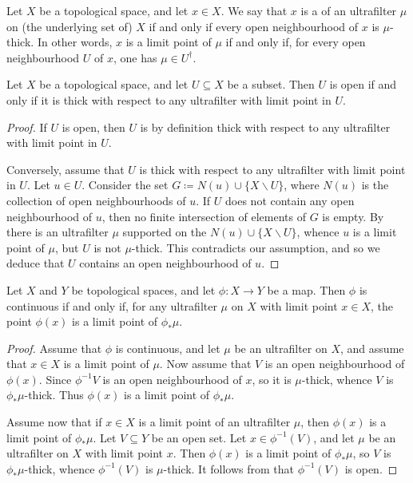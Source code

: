 \begin{dfn} \label{limitpointofultrafilter}
	Let $ X $ be a topological space, and let $ x \in X $.
	We say that $ x $ is a  of an ultrafilter $ \mu $ on (the underlying set of) $ X $ if and only if every open neighbourhood of $ x $ is $ \mu $-thick.
	In other words, $ x $ is a limit point of $ \mu $ if and only if, for every open neighbourhood $ U $ of $ x $, one has $ \mu \in U^{\dag} $.
\end{dfn}

\begin{lem} \label{opensetsarethickwrtultrafilters}
	Let $ X $ be a topological space, and let $ U \subseteq X$ be a subset.
	Then $ U $ is open if and only if it is thick with respect to any ultrafilter with limit point in $ U $.
\end{lem}

\begin{proof}
	If $ U $ is open, then $ U $ is by definition thick with respect to any ultrafilter with limit point in $ U $.

	Conversely, assume that $ U $ is thick with respect to any ultrafilter with limit point in $ U $.
	Let $ u \in U $.
	Consider the set $ G \coloneq N(u) \cup \{ X \smallsetminus U \} $, where $N(u)$ is the collection of open neighbourhoods of $u$.
	If $ U $ does not contain any open neighbourhood of $u$, then no finite intersection of elements of $ G $ is empty.
	By  there is an ultrafilter $ \mu $ supported on the $ N(u) \cup \{ X \smallsetminus U \} $, whence $ u $ is a limit point of $ \mu $, but $ U $ is not $ \mu $-thick.
	This contradicts our assumption, and so we deduce that $ U $ contains an open neighbourhood of $ u $.
\end{proof}

\begin{lem} \label{continuityviaultrafilters}
	Let $ X $ and $ Y $ be topological spaces, and let $ \phi \colon X \to Y $ be a map.
	Then $ \phi $ is continuous if and only if, for any ultrafilter $ \mu $ on $ X $ with limit point $ x \in X $, the point $ \phi(x) $ is a limit point of $ \phi_{\ast}\mu $.
\end{lem}

\begin{proof}
	Assume that $ \phi $ is continuous, and let $ \mu $ be an ultrafilter on $ X $, and assume that $ x \in X $ is a limit point of  $ \mu $.
	Now assume that $ V $ is an open neighbourhood of $ \phi(x) $.
	Since $ \phi^{-1}V $ is an open neighbourhood of $ x $, so it is $ \mu $-thick, whence $ V $ is $\phi_{\ast}\mu$-thick.
	Thus $ \phi(x) $ is a limit point of $ \phi_{\ast}\mu $.

	Assume now that if $ x \in X $ is a limit point of an ultrafilter $ \mu $, then $ \phi(x) $ is a limit point of $ \phi_{\ast}\mu $.
	Let $ V \subseteq Y $ be an open set.
	Let $ x \in \phi^{-1}(V) $, and let $ \mu $ be an ultrafilter on $ X $ with limit point $ x $.
	Then $ \phi(x) $ is a limit point of $ \phi_{\ast}\mu $, so $V$ is $ \phi_{\ast}\mu $-thick, whence $ \phi^{-1}(V) $ is $ \mu $-thick.
	It follows from  that $\phi^{-1}(V)$ is open.
\end{proof}

